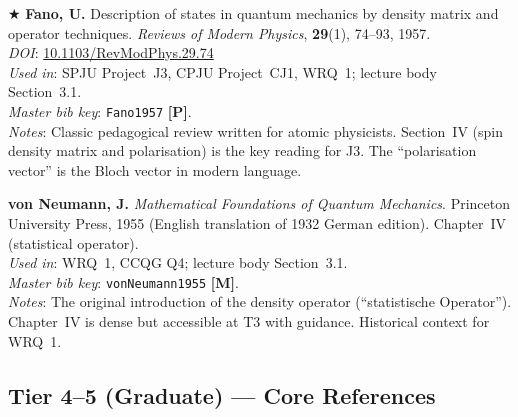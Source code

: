 \documentclass[11pt,a4paper]{article}
\begin{document}
\begin{enumerate}[leftmargin=2em, label={\textbf{[\arabic*]}}, itemsep=10pt]
\item $\bigstar$
  \textbf{Fano, U.}
  Description of states in quantum mechanics by density matrix and operator techniques.
  \textit{Reviews of Modern Physics}, \textbf{29}(1), 74--93, 1957.\\
  \textit{DOI}: \href{https://doi.org/10.1103/RevModPhys.29.74}{10.1103/RevModPhys.29.74}\\
  \textit{Used in}: SPJU Project~J3, CPJU Project~CJ1, WRQ~1; lecture body Section~3.1.\\
  \textit{Master bib key}: \texttt{Fano1957} \textbf{[P]}.\\
  \textit{Notes}: Classic pedagogical review written for atomic physicists.
  Section~IV (spin density matrix and polarisation) is the key reading for J3.
  The ``polarisation vector'' is the Bloch vector in modern language.

\item
  \textbf{von Neumann, J.}
  \textit{Mathematical Foundations of Quantum Mechanics}.
  Princeton University Press, 1955 (English translation of 1932 German edition).
  Chapter~IV (statistical operator).\\
  \textit{Used in}: WRQ~1, CCQG Q4; lecture body Section~3.1.\\
  \textit{Master bib key}: \texttt{vonNeumann1955} \textbf{[M]}.\\
  \textit{Notes}: The original introduction of the density operator (``statistische Operator'').
  Chapter~IV is dense but accessible at T3 with guidance. Historical context for WRQ~1.

\end{enumerate}

\bigskip
\subsection*{Tier 4--5 (Graduate) --- Core References}
\end{document}
